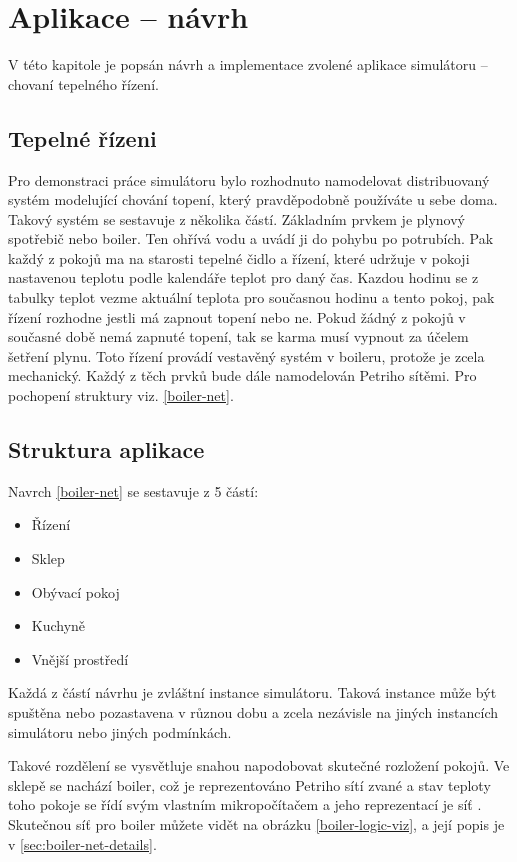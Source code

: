\chapter{Aplikace -- návrh}
\label{chap:app-arch}

V této kapitole je popsán návrh a implementace zvolené aplikace simulátoru -- chovaní tepelného řízení.

\section{Tepelné řízeni}
\label{sec:tepelne-rizeni}

Pro demonstraci práce simulátoru bylo rozhodnuto namodelovat distribuovaný systém modelující chování topení, který pravděpodobně používáte u sebe doma. Takový systém se sestavuje z několika částí. Základním prvkem je plynový spotřebič nebo boiler. Ten ohřívá vodu a uvádí ji do pohybu po potrubích. Pak každý z pokojů ma na starosti tepelné čidlo a řízení, které udržuje v pokoji nastavenou teplotu podle kalendáře teplot pro daný čas. Kazdou hodinu se z tabulky teplot vezme aktuální teplota pro současnou hodinu a tento pokoj, pak řízení rozhodne jestli má zapnout topení nebo ne. Pokud žádný z pokojů v současné době nemá zapnuté topení, tak se karma musí vypnout za účelem šetření plynu. Toto řízení provádí vestavěný systém v boileru, protože je zcela mechanický. Každý z těch prvků bude dále namodelován Petriho sítěmi. Pro pochopení struktury viz. \ref{boiler-net}.

\section{Struktura aplikace}

Navrch \ref{boiler-net} se sestavuje z 5 částí:
\begin{itemize}
 \item Řízení
 \item Sklep
 \item Obývací pokoj
 \item Kuchyně
 \item Vnější prostředí
\end{itemize}
Každá z částí návrhu je zvláštní instance simulátoru. Taková instance může být spuštěna nebo pozastavena v různou dobu a zcela nezávisle na jiných instancích simulátoru nebo jiných podmínkách.

Takové rozdělení se vysvětluje snahou napodobovat skutečné rozložení pokojů. Ve sklepě se nachází boiler, což je reprezentováno Petriho sítí zvané  a stav teploty toho pokoje se řídí svým vlastním mikropočítačem a jeho reprezentací je síť . Skutečnou síť pro boiler můžete vidět na obrázku \ref{boiler-logic-viz}, a její popis je v \ref{sec:boiler-net-details}.

